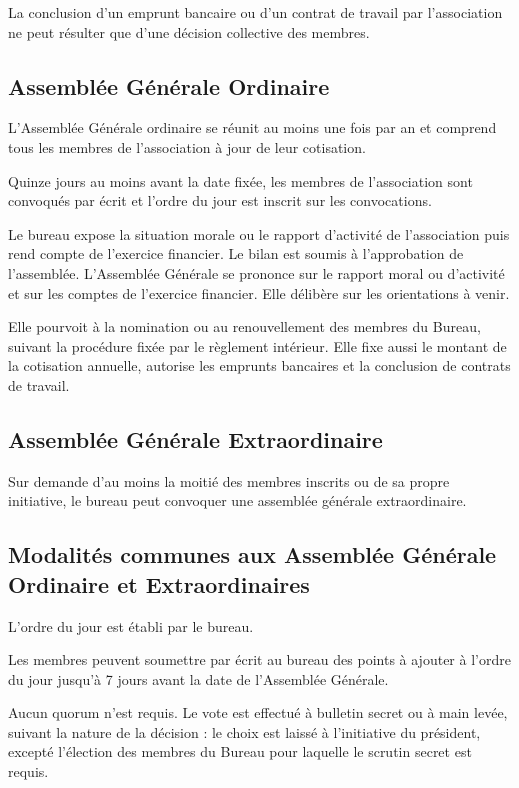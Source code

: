 \documentclass[a4paper,french,10pt]{article}
\begin{document}
La conclusion d’un emprunt bancaire ou d’un contrat de travail par
l’association ne peut résulter que d’une décision collective des
membres.

\subsection{Assemblée Générale Ordinaire}
\label{sec:ago}
L’Assemblée Générale ordinaire se réunit au moins une fois par an et
comprend tous les membres de l’association à jour de leur cotisation.

Quinze jours au moins avant la date fixée, les membres de
l’association sont convoqués par écrit et l’ordre du jour est inscrit
sur les convocations.


Le bureau expose la situation morale ou le rapport d'activité de
l'association puis rend compte de l'exercice financier. Le bilan est
soumis à l'approbation de l'assemblée. 
L’Assemblée Générale se prononce sur le rapport moral ou d’activité et
sur les comptes de l’exercice financier. Elle délibère sur les
orientations à venir.

Elle pourvoit à la nomination ou au renouvellement des membres du
Bureau, suivant la procédure fixée par le règlement intérieur. Elle
fixe aussi le montant de la cotisation annuelle, autorise les emprunts
bancaires et la conclusion de contrats de travail.


\subsection{Assemblée Générale Extraordinaire}
\label{sec:age}

Sur demande d'au moins la moitié des membres inscrits ou de sa propre
initiative, le bureau %
peut convoquer une assemblée générale extraordinaire.

\subsection{Modalités communes aux Assemblée Générale Ordinaire et Extraordinaires}
\label{sec:ag}
L'ordre du jour est établi par le bureau. %

Les membres peuvent soumettre par écrit au bureau des points à ajouter à l'ordre du jour jusqu'à 7 jours avant la date de l'Assemblée Générale.


Aucun quorum n'est requis. Le vote est effectué à bulletin secret ou à
main levée, suivant la nature de la décision : le choix est laissé à
l'initiative du président, excepté l'élection des membres du Bureau
pour laquelle le scrutin secret est requis.
\end{document}
